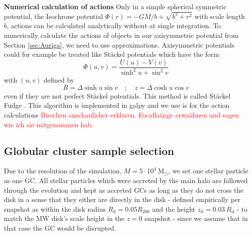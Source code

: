 \textbf{Numerical calculation of actions} Only in a simple spherical symmetric potential, the Isochrone potential $\Phi(r) = -GM/b + \sqrt{b^2+r^2}$ with scale length $b$, actions can be calculated analytically without at single integration. To numerically calculate the actions of objects in our axisymmetric potential from Section \ref{sec:Auriga}, we need to use approximations. Axisymmetric potentials could for example be treated like St\"ackel potentials \citep{deZeeuw...Staeckel..1985} which have the form
\begin{equation}\label{eq:Stackel_pot}
    \Phi(u,v) = \frac{U(u)-V(v)}{\sinh^2u + \sin^2v}
\end{equation}
with $(u,v)$ defined by 
\begin{equation}
    R = \Delta \sinh{u} \sin{v}\quad ; \quad z = \Delta \cosh{u}\cos{v}
\end{equation}
even if they are not perfect St\"ackel potentials. This method is called St\"ackel Fudge \citep{Binney...StaeckelFudge...2012}. This algorithm is implemented in galpy and we use is for the action calculations
\textcolor{red}{Bisschen anschaulicher erklaren. Focallaänge erwaähnen und sagen wie ich sie mitgenommen hab.}

\subsection{Globular cluster sample selection}\label{subsec:GC_selection}
Due to the resolution of the simulation, $M = 5 \cdot 10 ^ 4\ \mathrm{M}_{\odot}$, we set one stellar particle as one \ac{GC}. All stellar particles which were accreted by the main halo are followed through the evolution and kept as accreted \acp{GC} as long as they do not cross the disk in a sense that they either are directly in the disk - defined empirically per snapshot as within the disk radius $R_\mathrm{d} = 0.05  R_{200}$ and the height $z_\mathrm{d} = 0.03\ R_\mathrm{d}$ - to match the \ac{MW} disk's scale height in the $z = 0$ snapshot - since we assume that in that case the \ac{GC} would be disrupted. 

